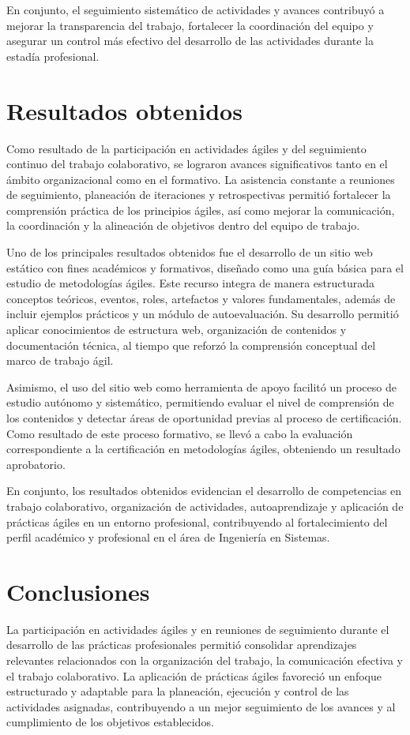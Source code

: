 \documentclass[12pt]{article}
\begin{document}
En conjunto, el seguimiento sistemático de actividades y avances contribuyó a mejorar la transparencia del trabajo, fortalecer la coordinación del equipo y asegurar un control más efectivo del desarrollo de las actividades durante la estadía profesional.


\section*{Resultados obtenidos}
Como resultado de la participación en actividades ágiles y del seguimiento continuo del trabajo colaborativo, se lograron avances significativos tanto en el ámbito organizacional como en el formativo. La asistencia constante a reuniones de seguimiento, planeación de iteraciones y retrospectivas permitió fortalecer la comprensión práctica de los principios ágiles, así como mejorar la comunicación, la coordinación y la alineación de objetivos dentro del equipo de trabajo.

Uno de los principales resultados obtenidos fue el desarrollo de un sitio web estático con fines académicos y formativos, diseñado como una guía básica para el estudio de metodologías ágiles. Este recurso integra de manera estructurada conceptos teóricos, eventos, roles, artefactos y valores fundamentales, además de incluir ejemplos prácticos y un módulo de autoevaluación. Su desarrollo permitió aplicar conocimientos de estructura web, organización de contenidos y documentación técnica, al tiempo que reforzó la comprensión conceptual del marco de trabajo ágil.

Asimismo, el uso del sitio web como herramienta de apoyo facilitó un proceso de estudio autónomo y sistemático, permitiendo evaluar el nivel de comprensión de los contenidos y detectar áreas de oportunidad previas al proceso de certificación. Como resultado de este proceso formativo, se llevó a cabo la evaluación correspondiente a la certificación en metodologías ágiles, obteniendo un resultado aprobatorio.

En conjunto, los resultados obtenidos evidencian el desarrollo de competencias en trabajo colaborativo, organización de actividades, autoaprendizaje y aplicación de prácticas ágiles en un entorno profesional, contribuyendo al fortalecimiento del perfil académico y profesional en el área de Ingeniería en Sistemas.


\section*{Conclusiones}
La participación en actividades ágiles y en reuniones de seguimiento durante el desarrollo de las prácticas profesionales permitió consolidar aprendizajes relevantes relacionados con la organización del trabajo, la comunicación efectiva y el trabajo colaborativo. La aplicación de prácticas ágiles favoreció un enfoque estructurado y adaptable para la planeación, ejecución y control de las actividades asignadas, contribuyendo a un mejor seguimiento de los avances y al cumplimiento de los objetivos establecidos.
\end{document}
